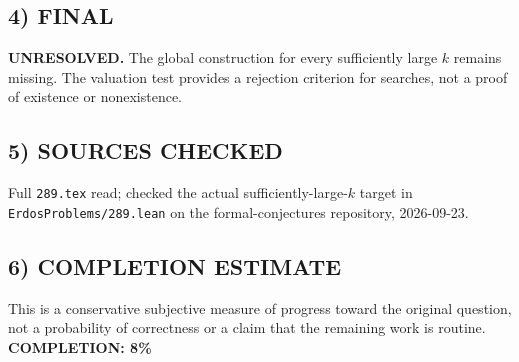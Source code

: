 \subsection{4) FINAL}
\textbf{UNRESOLVED.}
The global construction for every sufficiently large $k$ remains missing. The valuation test provides a rejection criterion for searches, not a proof of existence or nonexistence.
\subsection{5) SOURCES CHECKED}
Full \texttt{289.tex} read; checked the actual sufficiently-large-$k$ target in \texttt{ErdosProblems/289.lean} on the formal-conjectures repository, 2026-09-23.
\subsection{6) COMPLETION ESTIMATE}
This is a conservative subjective measure of progress toward the original question, not a probability of correctness or a claim that the remaining work is routine.
\textbf{COMPLETION: 8\%}
